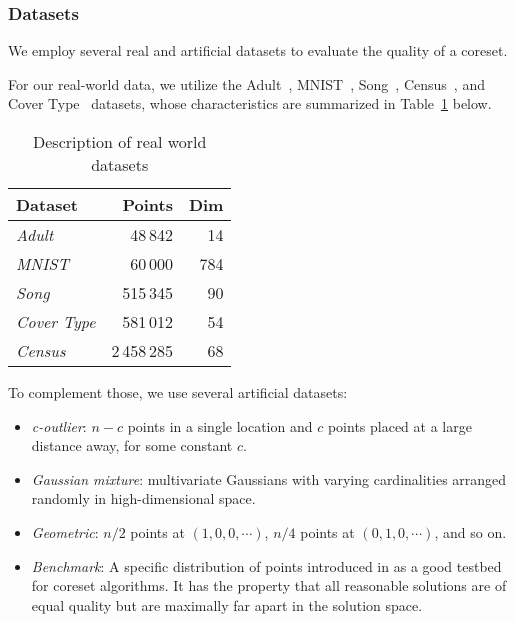 
\subsubsection{Datasets}


We employ several real and artificial datasets to evaluate the quality of a coreset. 

For our real-world data, we utilize the Adult~\cite{Dua:2019}, MNIST~\cite{mnist}, Song~\cite{song}, Census~\cite{census}, and Cover Type~\cite{covtype} datasets, whose characteristics are summarized in 
Table~\cref{tbl:datasets} below.
\begin{table}[htbp]
    \label{tbl:datasets}
    \centering
    \begin{tabular}{lrr}
        Dataset & Points & Dim \\
        \hline
        \emph{Adult} & 48\,842 & 14 \\
        \emph{MNIST} & 60\,000 & 784 \\
        \emph{Song} & 515\,345 & 90 \\
        \emph{Cover Type} & 581\,012 & 54 \\
        \emph{Census} & 2\,458\,285 & 68
    \end{tabular}
    \caption{Description of real world datasets}
\end{table}

To complement those, we use several artificial datasets:
\begin{itemize}
    \item \emph{c-outlier}: $n-c$ points in a single location and $c$ points placed at a large distance away, for some constant $c$.
    \item \emph{Gaussian mixture}: multivariate Gaussians with varying cardinalities arranged randomly in high-dimensional space. 
    \item \emph{Geometric}: $n/2$ points at $(1, 0, 0, \cdots)$, $n/4$ points at $(0, 1, 0, \cdots)$, and so on. 
    \item \emph{Benchmark}: A specific distribution of points introduced in \cite{chrisESA} as a good testbed for coreset algorithms. 
    It has the property that all reasonable solutions are of equal quality but are maximally far
            apart in the solution space.
\end{itemize}

